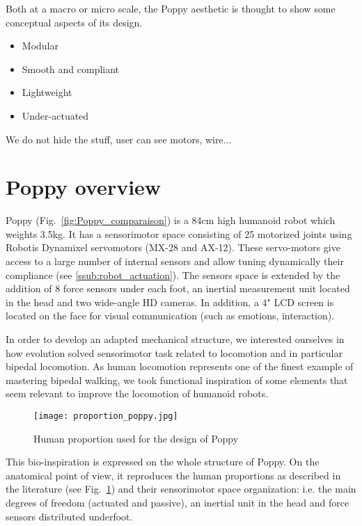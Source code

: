 Both at a macro or micro scale, the Poppy aesthetic is thought to show some conceptual aspects of its design.
\begin{itemize}
    \item Modular
    \item Smooth and compliant
    \item Lightweight
    \item Under-actuated
\end{itemize}

We do not hide the stuff, user can see motors, wire...



\section{Poppy overview} %

Poppy (Fig.~\ref{fig:Poppy_comparaison}) is a 84cm high humanoid robot which weights 3.5kg. It has a sensorimotor space consisting of 25 motorized joints using Robotis Dynamixel servomotors (MX-28 and AX-12). These servo-motors give access to a large number of internal sensors and allow tuning dynamically their compliance (see \ref{ssub:robot_actuation}). The sensors space is extended by the addition of 8 force sensors under each foot, an inertial measurement unit located in the head and two wide-angle HD cameras. In addition, a 4" LCD screen is located on the face for visual communication (such as emotions, interaction).



In order to develop an adapted mechanical structure, we interested ourselves in how evolution solved sensorimotor task related to locomotion and in particular bipedal locomotion. As human locomotion represents one of the finest example of mastering bipedal walking, we took functional inspiration of some elements that seem relevant to improve the locomotion of humanoid robots.

\begin{figure}[thpb]
    \centering
    \texttt{[image: proportion\_poppy.jpg]}
    \caption{Human proportion used for the design of Poppy \cite{dufour2005biomecanique}}
    \label{fig:proportion_poppy}
\end{figure}

This bio-inspiration is expressed on the whole structure of Poppy. On the anatomical point of view, it reproduces the human proportions as described in the literature \cite{dufour2005biomecanique}  (see Fig.~\ref{fig:proportion_poppy}) and their sensorimotor space organization: i.e. the main degrees of freedom (actuated and passive), an inertial unit in the head and force sensors distributed underfoot.

